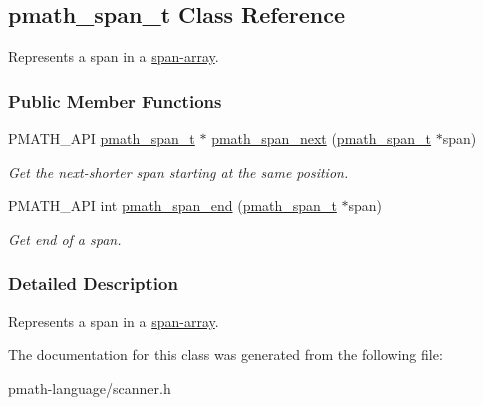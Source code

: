 \hypertarget{classpmath__span__t}{
\subsection{pmath\_\-span\_\-t Class Reference}
\label{classpmath__span__t}
}
Represents a span in a \hyperlink{classpmath__span__array__t}{span-array}.  


\subsubsection*{Public Member Functions}
\begin{CompactItemize}
\item 
PMATH\_\-API \hyperlink{classpmath__span__t}{pmath\_\-span\_\-t} $\ast$ \hyperlink{group__parser_g851892aa27e31d261213853112567202}{pmath\_\-span\_\-next} (\hyperlink{classpmath__span__t}{pmath\_\-span\_\-t} $\ast$span)
\begin{CompactList}\small\item\em Get the next-shorter span starting at the same position. \item\end{CompactList}\item 
PMATH\_\-API int \hyperlink{group__parser_g67b9dc2f6484ebbe48481b2b87d76b33}{pmath\_\-span\_\-end} (\hyperlink{classpmath__span__t}{pmath\_\-span\_\-t} $\ast$span)
\begin{CompactList}\small\item\em Get end of a span. \item\end{CompactList}\end{CompactItemize}


\subsubsection{Detailed Description}
Represents a span in a \hyperlink{classpmath__span__array__t}{span-array}. 

The documentation for this class was generated from the following file:\begin{CompactItemize}
\item 
pmath-language/scanner.h\end{CompactItemize}
